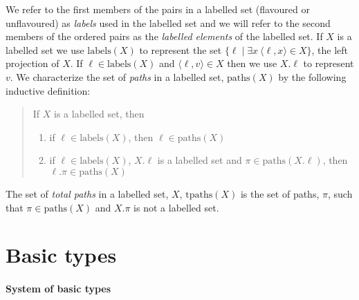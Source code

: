 We refer to the first members of the pairs in a
labelled set (flavoured or unflavoured) as \textit{labels} used in the labelled set and we will refer to
the second members of the ordered pairs as the \textit{labelled
  elements} of the labelled set.  If $X$ is a labelled set we use
$\mathrm{labels}(X)$ to represent the set $\{\ell\mid\exists 
x\ \langle\ell,x\rangle\in X\}$, the left projection of $X$.  If
$\ell\in\mathrm{labels}(X)$ and $\langle\ell,v\rangle\in X$ then we
use $X.\ell$ to represent $v$.  We characterize the set of
\textit{paths} in a labelled set, $\mathrm{paths}(X)$ by the following
inductive definition:
\begin{quote}
If $X$ is a labelled set, then
\begin{enumerate} 
 
\item if $\ell\in\mathrm{labels}(X)$, then $\ell\in\mathrm{paths}(X)$ 
 
\item if $\ell\in\mathrm{labels}(X)$, $X.\ell$ is a labelled set and
  $\pi\in\mathrm{paths}(X.\ell)$, then $\ell.\pi\in\mathrm{paths}(X)$ 
 
\end{enumerate} 
\end{quote}

The set of \textit{total paths} in a labelled set, $X$,
$\mathrm{tpaths}(X)$ is the set of paths, $\pi$, such that
\mbox{$\pi\in\mathrm{paths}(X)$} and $X.\pi$ is not a labelled set.
 
  



\section{Basic types}
\label{sec:basic}

\paragraph{System of basic types} \mbox{}

